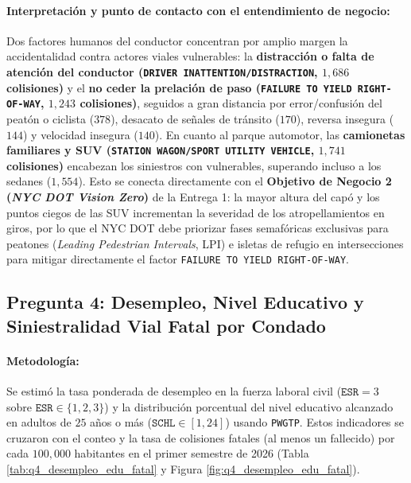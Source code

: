 \paragraph{Interpretación y punto de contacto con el entendimiento de negocio:}
Dos factores humanos del conductor concentran por amplio margen la accidentalidad contra actores viales vulnerables: la \textbf{distracción o falta de atención del conductor (\texttt{DRIVER INATTENTION/DISTRACTION}, $1,686$ colisiones)} y el \textbf{no ceder la prelación de paso (\texttt{FAILURE TO YIELD RIGHT-OF-WAY}, $1,243$ colisiones)}, seguidos a gran distancia por error/confusión del peatón o ciclista ($378$), desacato de señales de tránsito ($170$), reversa insegura ($144$) y velocidad insegura ($140$). En cuanto al parque automotor, las \textbf{camionetas familiares y SUV (\texttt{STATION WAGON/SPORT UTILITY VEHICLE}, $1,741$ colisiones)} encabezan los siniestros con vulnerables, superando incluso a los sedanes ($1,554$). Esto se conecta directamente con el \textbf{Objetivo de Negocio 2 (\textit{NYC DOT Vision Zero})} de la Entrega 1: la mayor altura del capó y los puntos ciegos de las SUV incrementan la severidad de los atropellamientos en giros, por lo que el NYC DOT debe priorizar fases semafóricas exclusivas para peatones (\textit{Leading Pedestrian Intervals}, LPI) e isletas de refugio en intersecciones para mitigar directamente el factor \texttt{FAILURE TO YIELD RIGHT-OF-WAY}.

\subsection{Pregunta 4: Desempleo, Nivel Educativo y Siniestralidad Vial Fatal por Condado}
\label{subsec:respuesta_q4}

\paragraph{Metodología:} Se estimó la tasa ponderada de desempleo en la fuerza laboral civil ($\texttt{ESR} = 3$ sobre $\texttt{ESR} \in \{1, 2, 3\}$) y la distribución porcentual del nivel educativo alcanzado en adultos de $25$ años o más ($\texttt{SCHL} \in [1, 24]$) usando \texttt{PWGTP}. Estos indicadores se cruzaron con el conteo y la tasa de colisiones fatales (al menos un fallecido) por cada $100,000$ habitantes en el primer semestre de 2026 (Tabla \ref{tab:q4_desempleo_edu_fatal} y Figura \ref{fig:q4_desempleo_edu_fatal}).

